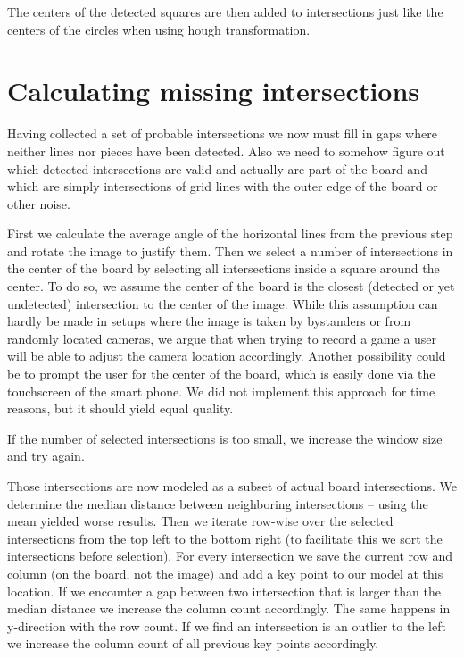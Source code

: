 	The centers of the detected squares are then added to intersections just like the centers of the circles when using hough transformation.

	\section{Calculating missing intersections}
	\label{detector-calculate}
	Having collected a set of probable intersections we now must fill in gaps where neither lines nor pieces have been detected. Also we need to somehow figure out which detected intersections are valid and actually are part of the board and which are simply intersections of grid lines with the outer edge of the board or other noise.

	First we calculate the average angle of the horizontal lines from the previous step and rotate the image to justify them. Then we select a number of intersections in the center of the board by selecting all intersections inside a square around the center. To do so, we assume the center of the board is the closest (detected or yet undetected) intersection to the center of the image. While this assumption can hardly be made in setups where the image is taken by bystanders or from randomly located cameras, we argue that when trying to record a game a user will be able to adjust the camera location accordingly. Another possibility could be to prompt the user for the center of the board, which is easily done via the touchscreen of the smart phone. We did not implement this approach for time reasons, but it should yield equal quality.

	If the number of selected intersections is too small, we increase the window size and try again.

	Those intersections are now modeled as a subset of actual board intersections. We determine the median distance between neighboring intersections -- using the mean yielded worse results. Then we iterate row-wise over the selected intersections from the top left to the bottom right (to facilitate this we sort the intersections before selection). For every intersection we save the current row and column (on the board, not the image) and add a key point to our model at this location. If we encounter a gap between two intersection that is larger than the median distance we increase the column count accordingly. The same happens in y-direction with the row count. If we find an intersection is an outlier to the left we increase the column count of all previous key points accordingly.

